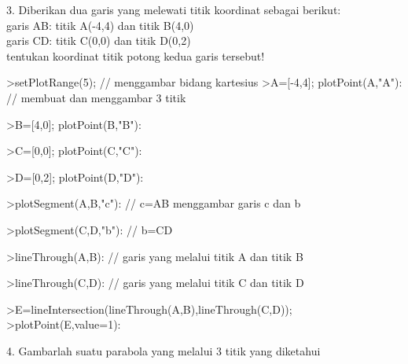\documentclass[a4paper,10pt]{article}
\begin{document}
\begin{eulernotebook}
\begin{eulercomment}
\begin{eulercomment}
\begin{eulercomment}
3. Diberikan dua garis yang melewati titik koordinat sebagai berikut:\\
garis AB: titik A(-4,4) dan titik B(4,0)\\
garis CD: titik C(0,0) dan titik D(0,2)\\
tentukan koordinat titik potong kedua garis tersebut!
\end{eulercomment}
\begin{eulerprompt}
>setPlotRange(5); // menggambar bidang kartesius
>A=[-4,4]; plotPoint(A,"A"): // membuat dan menggambar 3 titik
\end{eulerprompt}
\begin{eulerprompt}
>B=[4,0]; plotPoint(B,"B"):
\end{eulerprompt}
\begin{eulerprompt}
>C=[0,0]; plotPoint(C,"C"):
\end{eulerprompt}
\begin{eulerprompt}
>D=[0,2]; plotPoint(D,"D"):
\end{eulerprompt}
\begin{eulerprompt}
>plotSegment(A,B,"c"): // c=AB menggambar garis c dan b
\end{eulerprompt}
\begin{eulerprompt}
>plotSegment(C,D,"b"): // b=CD
\end{eulerprompt}
\begin{eulerprompt}
>lineThrough(A,B): // garis yang melalui titik A dan titik B
\end{eulerprompt}
\begin{eulerprompt}
>lineThrough(C,D): // garis yang melalui titik C dan titik D
\end{eulerprompt}
\begin{eulerprompt}
>E=lineIntersection(lineThrough(A,B),lineThrough(C,D));
>plotPoint(E,value=1):
\end{eulerprompt}
\begin{eulercomment}
4. Gambarlah suatu parabola yang melalui 3 titik yang diketahui


\end{eulercomment}
\end{eulercomment}
\end{eulercomment}
\end{eulernotebook}
\end{document}
